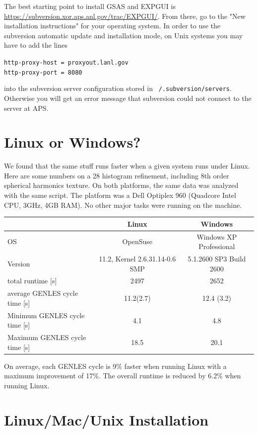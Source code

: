 The best starting point to install GSAS and EXPGUI is \url{https://subversion.xor.aps.anl.gov/trac/EXPGUI/}. From there, go to the "New installation instructions" for your operating system. In order to use the subversion automatic update and installation mode, on Unix systems you may have to add the lines

\texttt{http-proxy-host = proxyout.lanl.gov\\
http-proxy-port = 8080\\
}

into the subversion server configuration stored in \texttt{~/.subversion/servers}. Otherwise you will get an error message that subversion could not connect to the server at APS.


\section{Linux or Windows?}

We found that the same stuff runs faster when a given system runs under Linux. Here are some numbers on a 28 histogram refinement, including 8th order spherical harmonics texture. On both platforms, the same data was analyzed with the same script. The platform was a Dell Optiplex 960 (Quadcore Intel CPU, 3GHz, 4GB RAM). No other major tasks were running on the machine.

\begin{tabular}{|l|c|c|}
\hline
&Linux&Windows\\
\hline
OS&OpenSuse&Windows XP Professional\\
Version&11.2, Kernel 2.6.31.14-0.6 SMP&5.1.2600 SP3 Build 2600\\
total runtime [s]&2497&2652\\
average GENLES cycle time [s]&11.2(2.7)&12.4 (3.2)\\
Minimum GENLES cycle time [s]&4.1&4.8\\
Maximum GENLES cycle time [s]&18.5&20.1\\
\hline
\end{tabular}

On average, each GENLES cycle is 9\% faster when running Linux with a maximum improvement of 17\%. The overall runtime is reduced by 6.2\% when running Linux.

\section{Linux/Mac/Unix Installation}


